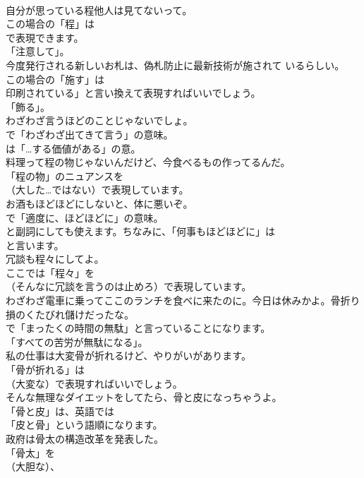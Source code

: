 \documentclass[8pt]{extreport}
\begin{document}
\begin{CJK}{UTF8}{min}
\\	自分が思っている程他人は見てないって。 
\\	この場合の「程」は
\\	で表現できます。
\\	「注意して」。	
\\	今度発行される新しいお札は、偽札防止に最新技術が施されて いるらしい。 
\\	この場合の「施す」は
\\	印刷されている」と言い換えて表現すればいいでしょう。
\\	「飾る」。	
\\	わざわざ言うほどのことじゃないでしょ。 
\\	で「わざわざ出てきて言う」の意味。
\\	は「…する価値がある」の意。	
\\	料理って程の物じゃないんだけど、今食べるもの作ってるんだ。 
\\	「程の物」のニュアンスを 
\\	（大した…ではない）で表現しています。	
\\	お酒もほどほどにしないと、体に悪いぞ。 
\\	で「適度に、ほどほどに」の意味。
\\	と副詞にしても使えます。ちなみに、「何事もほどほどに」は
\\	と言います。	
\\	冗談も程々にしてよ。 
\\	ここでは「程々」を
\\	（そんなに冗談を言うのは止めろ）で表現しています。	
\\	わざわざ電車に乗ってここのランチを食べに来たのに。今日は休みかよ。骨折り損のくたびれ儲けだったな。 
\\	で「まったくの時間の無駄」と言っていることになります。
\\	「すべての苦労が無駄になる」。	
\\	私の仕事は大変骨が折れるけど、やりがいがあります。 
\\	「骨が折れる」は 
\\	（大変な）で表現すればいいでしょう。	
\\	そんな無理なダイエットをしてたら、骨と皮になっちゃうよ。 
\\	「骨と皮」は、英語では
\\	「皮と骨」という語順になります。	
\\	政府は骨太の構造改革を発表した。 
\\	「骨太」を 
\\	（大胆な）、

\end{CJK}
\end{document}
